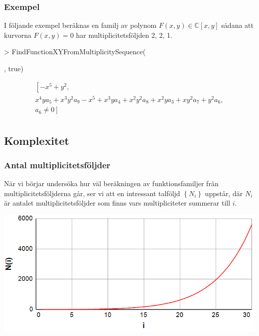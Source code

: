 \documentclass{beamer}
\begin{document}
\begin{frame}
	\frametitle{Exempel}
	\begin{example}
		I följande exempel beräknas en familj av polynom $F(x, y) \in \mathbb{C}[x, y]$ sådana att kurvorna $F(x, y) = 0$ har multiplicitetsföljden 2, 2, 1.
		
		\begin{semiverbatim}
			> FindFunctionXYFromMultiplicitySequence(

\qquad [2,2,1], true)
		\end{semiverbatim}
\[
\begin{array}{l}
\left[-x^5+y^2,\right.\\
x^4ya_5+x^3y^2a_9-x^5+x^3ya_4+x^2y^2a_8+x^2ya_3+xy^2a_7+y^2a_6,\\
\left.a_6 \neq 0\right]\\
\end{array}
\]
	\end{example}
\end{frame}



\subsection{Komplexitet}

\begin{frame}
	\frametitle{Antal multiplicitetsföljder}
När vi börjar undersöka hur väl beräkningen av funktionsfamiljer från multiplicitetsföljderna går, ser vi att en intressant talföljd $\left\{N_i\right\}$ uppstår, där $N_i$ är antalet multiplicitetsföljder som finns vars multipliciteter summerar till $i$.

\begin{center}
	\includegraphics[scale=0.5]{Export/Complexity1.png}
\end{center}
\end{frame}
\end{document}
